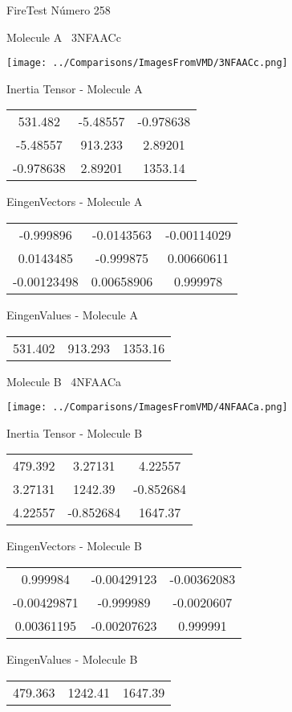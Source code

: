 \vtab[-3cm]
\begin{center}
{\large FireTest \tab Número 258}
\end{center}
\begin{multicols}{2}
\begin{center}

Molecule A \
3NFAACc

\texttt{[image: ../Comparisons/ImagesFromVMD/3NFAACc.png]}

Inertia Tensor - Molecule A \\
\begin{tabular}{|c c c|}
531.482	 & 	-5.48557	 & 	-0.978638	 \\
-5.48557	 & 	913.233	 & 	2.89201	 \\
-0.978638	 & 	2.89201	 & 	1353.14
\end{tabular}

\vtab
 EingenVectors - Molecule A     \\
\begin{tabular}{|c c c|}
-0.999896	 & 	-0.0143563	 & 	-0.00114029	 \\
0.0143485	 & 	-0.999875	 & 	0.00660611	 \\
-0.00123498	 & 	0.00658906	 & 	0.999978
\end{tabular}

\vtab
 EingenValues - Molecule A     \\
\begin{tabular}{|c c c|}
531.402	 & 	913.293	 & 	1353.16	 \\
\end{tabular}
\columnbreak

Molecule B \
4NFAACa

\texttt{[image: ../Comparisons/ImagesFromVMD/4NFAACa.png]}

Inertia Tensor - Molecule B \\
\begin{tabular}{|c c c|}
479.392	 & 	3.27131	 & 	4.22557	 \\
3.27131	 & 	1242.39	 & 	-0.852684	 \\
4.22557	 & 	-0.852684	 & 	1647.37
\end{tabular}

\vtab
 EingenVectors - Molecule B     \\
\begin{tabular}{|c c c|}
0.999984	 & 	-0.00429123	 & 	-0.00362083	 \\
-0.00429871	 & 	-0.999989	 & 	-0.0020607	 \\
0.00361195	 & 	-0.00207623	 & 	0.999991
\end{tabular}

\vtab
 EingenValues - Molecule B     \\
\begin{tabular}{|c c c|}
479.363	 & 	1242.41	 & 	1647.39	 \\
\end{tabular}

\end{center}
\end{multicols}

